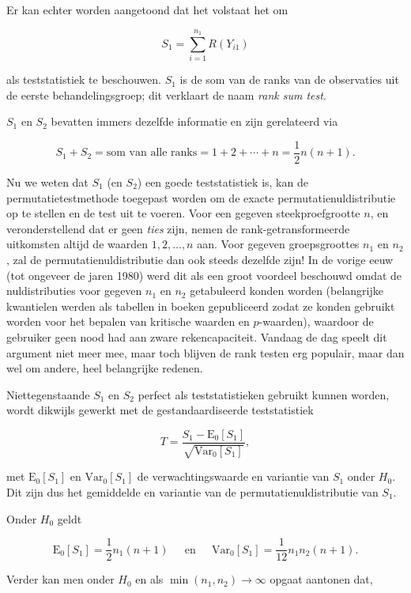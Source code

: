 \documentclass[
  dutch,
  letterpaper,
  12pt]{book}
\theoremstyle{definition}
\theoremstyle{definition}
\theoremstyle{definition}
\theoremstyle{remark}
\begin{document}
Er kan echter worden aangetoond dat het volstaat het om

\[S_1=\sum_{i=1}^{n_1} R(Y_{i1})\]

als teststatistiek te beschouwen. \(S_1\) is de som van de ranks van de
observaties uit de eerste behandelingsgroep; dit verklaart de naam
\emph{rank sum test}.

\(S_1\) en \(S_2\) bevatten immers dezelfde informatie en zijn
gerelateerd via

\[S_1+S_2 = \text{som van alle ranks} = 1+2+\cdots + n=\frac{1}{2}n(n+1).\]

Nu we weten dat \(S_1\) (en \(S_2\)) een goede teststatistiek is, kan de
permutatietestmethode toegepast worden om de exacte
permutatienuldistributie op te stellen en de test uit te voeren. Voor
een gegeven steekproefgrootte \(n\), en veronderstellend dat er geen
\emph{ties} zijn, nemen de rank-getransformeerde uitkomsten altijd de
waarden \(1, 2, \ldots, n\) aan. Voor gegeven groepsgroottes \(n_1\) en
\(n_2\), zal de permutatienuldistributie dan ook steeds dezelfde zijn!
In de vorige eeuw (tot ongeveer de jaren 1980) werd dit als een groot
voordeel beschouwd omdat de nuldistributies voor gegeven \(n_1\) en
\(n_2\) getabuleerd konden worden (belangrijke kwantielen werden als
tabellen in boeken gepubliceerd zodat ze konden gebruikt worden voor het
bepalen van kritische waarden en \(p\)-waarden), waardoor de gebruiker
geen nood had aan zware rekencapaciteit. Vandaag de dag speelt dit
argument niet meer mee, maar toch blijven de rank testen erg populair,
maar dan wel om andere, heel belangrijke redenen.

Niettegenstaande \(S_1\) en \(S_2\) perfect als teststatistieken
gebruikt kunnen worden, wordt dikwijls gewerkt met de gestandaardiseerde
teststatistiek

\[T = \frac{S_1-\text{E}_{0}\left[S_1\right]}{\sqrt{\text{Var}_{0}\left[S_1\right]}},\]

met \(\text{E}_{0}\left[S_1\right]\) en
\(\text{Var}_{0}\left[S_1\right]\) de verwachtingswaarde en variantie
van \(S_1\) onder \(H_0\). Dit zijn dus het gemiddelde en variantie van
de permutatienuldistributie van \(S_1\).

Onder \(H_0\) geldt

\[\text{E}_{0}\left[S_1\right]= \frac{1}{2}n_1(n+1) \;\;\;\;\text{ en }\;\;\;\; \text{Var}_{0}\left[S_1\right]=\frac{1}{12}n_1n_2(n+1).\]

Verder kan men onder \(H_0\) en als \(\min(n_1,n_2)\rightarrow \infty\)
opgaat aantonen dat,
\end{document}
